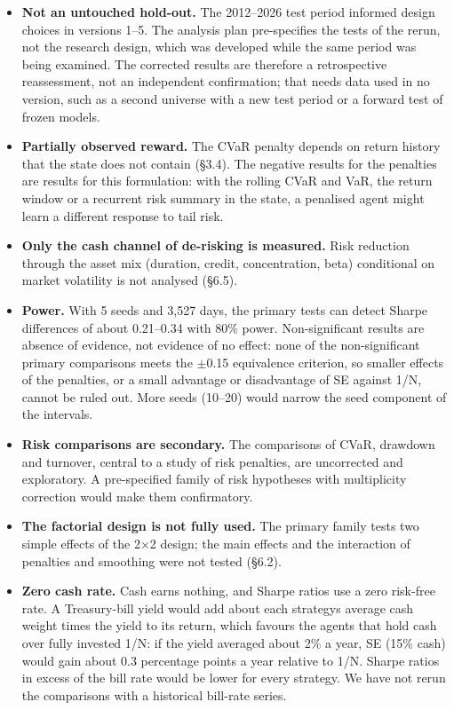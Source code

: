 \documentclass[11pt]{article}
\providecommand{\tightlist}{\setlength{\itemsep}{0pt}\setlength{\parskip}{0pt}}
\begin{document}
\begin{itemize}
\tightlist
\item
  \textbf{Not an untouched hold-out.} The 2012--2026 test period informed design choices in versions 1--5. The analysis plan pre-specifies the tests of the rerun, not the research design, which was developed while the same period was being examined. The corrected results are therefore a retrospective reassessment, not an independent confirmation; that needs data used in no version, such as a second universe with a new test period or a forward test of frozen models.
\item
  \textbf{Partially observed reward.} The CVaR penalty depends on return history that the state does not contain (\S{}3.4). The negative results for the penalties are results for this formulation: with the rolling CVaR and VaR, the return window or a recurrent risk summary in the state, a penalised agent might learn a different response to tail risk.
\item
  \textbf{Only the cash channel of de-risking is measured.} Risk reduction through the asset mix (duration, credit, concentration, beta) conditional on market volatility is not analysed (\S{}6.5).
\item
  \textbf{Power.} With 5 seeds and 3,527 days, the primary tests can detect Sharpe differences of about 0.21--0.34 with 80\% power. Non-significant results are absence of evidence, not evidence of no effect: none of the non-significant primary comparisons meets the $\pm$0.15 equivalence criterion, so smaller effects of the penalties, or a small advantage or disadvantage of SE against 1/N, cannot be ruled out. More seeds (10--20) would narrow the seed component of the intervals.
\item
  \textbf{Risk comparisons are secondary.} The comparisons of CVaR, drawdown and turnover, central to a study of risk penalties, are uncorrected and exploratory. A pre-specified family of risk hypotheses with multiplicity correction would make them confirmatory.
\item
  \textbf{The factorial design is not fully used.} The primary family tests two simple effects of the 2$\times$2 design; the main effects and the interaction of penalties and smoothing were not tested (\S{}6.2).
\item
  \textbf{Zero cash rate.} Cash earns nothing, and Sharpe ratios use a zero risk-free rate. A Treasury-bill yield would add about each strategy\textquotesingle s average cash weight times the yield to its return, which favours the agents that hold cash over fully invested 1/N: if the yield averaged about 2\% a year, SE (15\% cash) would gain about 0.3 percentage points a year relative to 1/N. Sharpe ratios in excess of the bill rate would be lower for every strategy. We have not rerun the comparisons with a historical bill-rate series.

\end{itemize}
\end{document}
